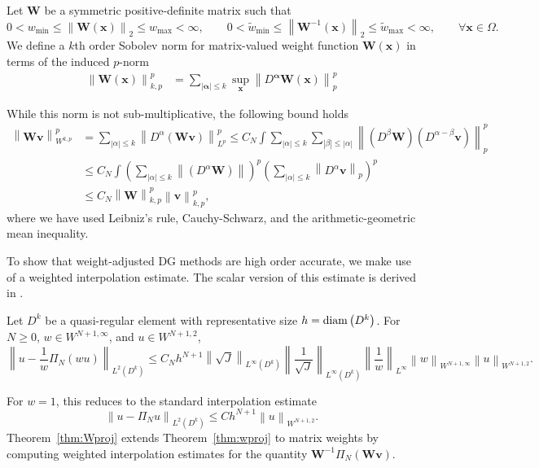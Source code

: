 \documentclass{siamart0216}
\newcommand{\nor}[1]{\left\| #1 \right\|}
\newcommand{\LRp}[1]{\left( #1 \right)}
\newcommand{\LRb}[1]{\left| #1 \right|}
\newcommand{\LinfDk}{L^{\infty}\LRp{D^k}}
\begin{document}
Let $\bm{W}$ be a symmetric positive-definite matrix such that
\[
0 < w_{\min} \leq  \nor{\bm{W}(\bm{x})}_2 \leq w_{\max} < \infty, \qquad 0 < \tilde{w}_{\min} \leq  \nor{\bm{W}^{-1}(\bm{x})}_2 \leq \tilde{w}_{\max} < \infty, \qquad \forall \bm{x} \in \Omega.
\]
We define a $k$th order Sobolev norm for matrix-valued weight function $\bm{W}(\bm{x})$ in terms of the induced $p$-norm
\begin{align*}
\nor{\bm{W}(\bm{x})}_{k,p}^p &= \sum_{\LRb{\bm{\alpha}} \leq k} \sup_{\bm{x}} \nor{D^{\bm{\alpha}}\bm{W}(\bm{x})}^p_p
\end{align*}

While this norm is not sub-multiplicative, the following bound holds
\begin{align*}
\nor{\bm{W}{\bm{v}}}_{W^{k,p}}^p &= \sum_{\LRb{\alpha}\leq k} \nor{D^{\alpha}\LRp{\bm{W}\bm{v}}}_{L^p}^p 
\leq C_N \int  \sum_{\LRb{\alpha}\leq k} \sum_{\LRb{\beta}\leq \LRb{\alpha}} \nor{\LRp{D^{\beta}\bm{W}}\LRp{D^{\alpha-\beta}\bm{v}} }_{p}^p \\
&\leq C_N\int \LRp{\sum_{\LRb{\alpha}\leq k} \nor{\LRp{D^{\alpha}\bm{W}}}}^p \LRp{\sum_{\LRb{\alpha}\leq k} \nor{D^{\alpha}\bm{v}}_{p} }^p\\
&\leq C_N \nor{\bm{W}}_{k,p}^p \nor{\bm{v}}_{k,p}^p,
\end{align*}
where we have used Leibniz's rule, Cauchy-Schwarz, and the arithmetic-geometric mean inequality.  

To show that weight-adjusted DG methods are high order accurate, we make use of a weighted interpolation estimate.  The scalar version of this estimate is derived in \cite{warburton2013low,chan2016weight1}.  

\begin{theorem}
Let $D^k$ be a quasi-regular element with representative size $h = {\rm diam}\LRp{D^k}$. For $N \geq 0$, $w\in W^{N+1,\infty}$, and $u\in W^{N+1,2}$, 
\[
\nor{u - \frac{1}{w}\Pi_N(wu)}_{L^2\LRp{D^k}} \leq C_N h^{N+1} \nor{{\sqrt{J}}}_{\LinfDk}\nor{\frac{1}{\sqrt{J}}}_{\LinfDk}\nor{\frac{1}{w}}_{L^\infty}\nor{w}_{W^{N+1,\infty}}\nor{u}_{W^{N+1,2}}.
\]
\label{thm:wproj}
\end{theorem}

For $w = 1$, this reduces to the standard interpolation estimate
\[
\nor{u-\Pi_N u}_{L^2\LRp{D^k}} \leq Ch^{N+1}\nor{u}_{W^{N+1,2}}.
\]  
Theorem~\ref{thm:Wproj} extends Theorem~\ref{thm:wproj} to matrix weights by computing weighted interpolation estimates for the quantity $\bm{W}^{-1}\Pi_N\LRp{\bm{W}\bm{v}}$.  
\end{document}
